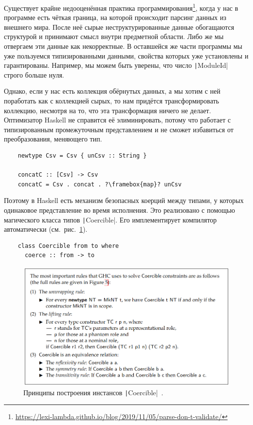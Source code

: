 Существует крайне недооценённая практика программирования\footnote{\url{https://lexi-lambda.github.io/blog/2019/11/05/parse-don-t-validate/}}, когда у нас в программе есть чёткая граница, на которой происходит парсинг данных из внешнего мира.
После неё сырые неструктурированные данные обогащаются структурой и принимают смысл внутри предметной области.
Либо же мы отвергаем эти данные как некорректные.
В оставшейся же части программы мы уже пользуемся типизированными данными, свойства которых уже установлены и гарантированы.
Например, мы можем быть уверены, что число \texttt|ModuleId| строго больше нуля.

Однако, если у нас есть коллекция обёрнутых данных, а мы хотим с ней поработать как с коллекцией сырых, то нам придётся трансформировать коллекцию, несмотря на то, что эта трансформация ничего не делает.
Оптимизатор Haskell не справится её элиминировать, потому что работает с типизированным промежуточным представлением и не сможет избавиться от преобразования, меняющего тип.
\begin{verbatim}
    newtype Csv = Csv { unCsv :: String }

    concatC :: [Csv] -> Csv
    concatC = Csv . concat . ?\framebox{map}? unCsv
\end{verbatim}

Поэтому в Haskell есть механизм безопасных коерций между типами, у которых одинаковое представление во время исполнения.
Это реализовано с помощью магического класса типов \texttt|Coercible|.
Его имплементирует компилятор автоматически (см.\ рис.~\ref{fig:coersions}).
\begin{verbatim}
    class Coercible from to where
      coerce :: from -> to
\end{verbatim}

\begin{figure}[h]
    \centering
    \includegraphics[width=\linewidth]{figs/coersions}
    \caption{Принципы построения инстансов \texttt|Coercible|~\cite{breitner2014safe}.}
    \label{fig:coersions}
\end{figure}


